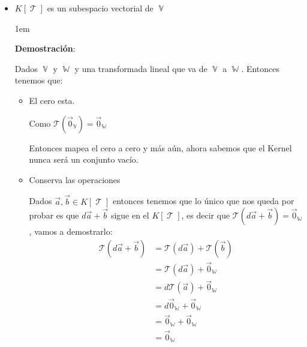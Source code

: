 \documentclass[12pt, fleqn]{report}                             %
\newenvironment{SmallIndentation}[1][0.75em]                    %
        {\begin{adjustwidth}{#1}{}\begin{footnotesize}}             %
        {\end{footnotesize}\end{adjustwidth}}                       %
\theoremstyle{break}                                            %
\DeclareMathOperator \VectorSet    {\mathbb{V}}                 %
\DeclareMathOperator \SubVectorSet {\mathbb{W}}                 %
\DeclareMathOperator \LinealTransformation {\mathcal{T}}        %
\newcommand{\Wrap}[1]           {\left( #1 \right)}             %
\newcommand{\FnLinTrans}[1]{\mathcal{T}\Wrap{#1}}               %
\begin{document}
                \begin{itemize}
                    
                    \item $K[\LinealTransformation]$ es un subespacio vectorial
                        de $\VectorSet$

                        \begin{SmallIndentation}[1em]
                            \textbf{Demostración}:
                            
                            Dados $\VectorSet$ y $\SubVectorSet$ y una transformada lineal
                            que va de $\VectorSet$ a $\SubVectorSet$.
                            Entonces tenemos que:

                            \begin{itemize}
                                \item 
                                    El cero esta.

                                    Como $\FnLinTrans{\vec 0_{\VectorSet}} = \vec 0_{\SubVectorSet}$

                                    Entonces mapea el cero a cero y más aún, ahora sabemos que el Kernel nunca
                                    será un conjunto vacío.

                                \item 
                                    Conserva las operaciones

                                    Dados $\vec a, \vec b \in K[\LinealTransformation]$ entonces
                                    tenemos que lo único que nos queda por probar es que $d\vec a + \vec b$
                                    sigue en el $K[\LinealTransformation]$, es decir que 
                                    $\FnLinTrans{d\vec a + \vec b} = \vec 0_{\SubVectorSet}$,
                                    vamos a demostrarlo:
                                    \begin{align*}
                                        \FnLinTrans{d\vec a + \vec b}
                                            &= \FnLinTrans{d\vec a} + \FnLinTrans{\vec b}       \\
                                            &= \FnLinTrans{d\vec a} + \vec 0_{\SubVectorSet}    \\
                                            &= d\FnLinTrans{\vec a} + \vec 0_{\SubVectorSet}    \\
                                            &= d\vec 0_{\SubVectorSet} + \vec 0_{\SubVectorSet} \\
                                            &= \vec 0_{\SubVectorSet} + \vec 0_{\SubVectorSet}  \\
                                            &= \vec 0_{\SubVectorSet}
                                    \end{align*}


\end{itemize}
\end{SmallIndentation}
\end{itemize}
\end{document}
